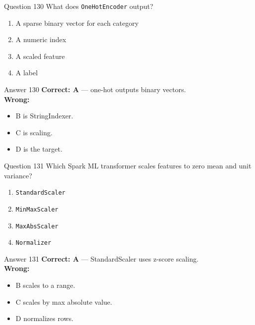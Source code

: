 \documentclass[aspectratio=169,11pt]{beamer}
\begin{document}
	\begin{frame}{Question 130}
		What does \texttt{OneHotEncoder} output?
		\begin{enumerate}[label=\Alph*.]
			\item A sparse binary vector for each category
			\item A numeric index
			\item A scaled feature
			\item A label
		\end{enumerate}
	\end{frame}
	\begin{frame}{Answer 130}
		\textbf{Correct: A} --- one-hot outputs binary vectors.\\
		\vspace{0.5em}
		\textbf{Wrong:}
		\begin{itemize}
			\item B is StringIndexer.
			\item C is scaling.
			\item D is the target.
		\end{itemize}
	\end{frame}
	
	\begin{frame}{Question 131}
		Which Spark ML transformer scales features to zero mean and unit variance?
		\begin{enumerate}[label=\Alph*.]
			\item \texttt{StandardScaler}
			\item \texttt{MinMaxScaler}
			\item \texttt{MaxAbsScaler}
			\item \texttt{Normalizer}
		\end{enumerate}
	\end{frame}
	\begin{frame}{Answer 131}
		\textbf{Correct: A} --- StandardScaler uses z-score scaling.\\
		\vspace{0.5em}
		\textbf{Wrong:}
		\begin{itemize}
			\item B scales to a range.
			\item C scales by max absolute value.
			\item D normalizes rows.
		\end{itemize}
	\end{frame}
	
\end{document}
